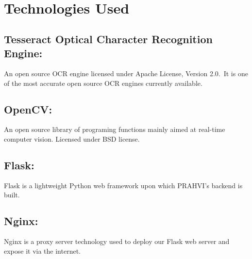\chapter{Technologies Used}



\section{Tesseract Optical Character Recognition Engine:}
An open source OCR engine licensed under Apache License, Version 2.0.\footnotemark~It is one of the most accurate open source OCR engines currently available.




\section{OpenCV:}
An open source library of programing functions mainly aimed at real-time computer vision. Licensed under BSD license.\footnotemark

\section{Flask:}
Flask is a lightweight Python web framework upon which PRAHVI's backend is built.

\section{Nginx:}
Nginx is a proxy server technology used to deploy our Flask web server and expose it via the internet.






